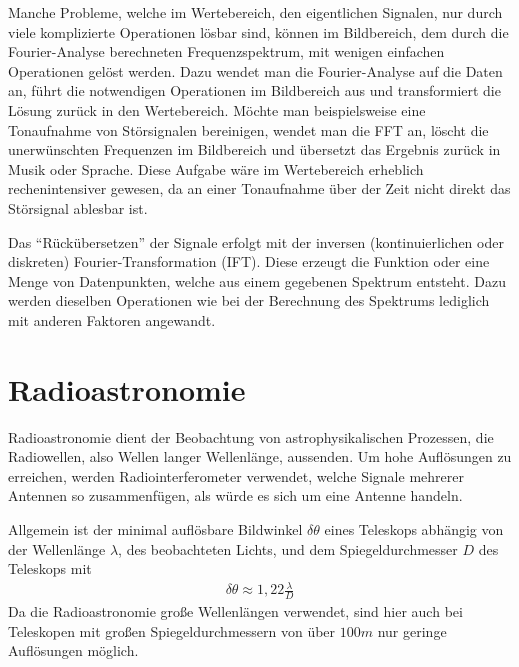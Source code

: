 \documentclass[]{dsadokumentation}
\begin{document}
Manche Probleme, welche im Wertebereich, den eigentlichen Signalen, nur durch viele komplizierte Operationen l\"osbar sind, k\"onnen im Bildbereich, dem durch die Fourier-Analyse berechneten Frequenzspektrum, mit wenigen einfachen Operationen gel\"ost werden. Dazu wendet man die Fourier-Analyse auf die Daten an, führt die notwendigen Operationen im Bildbereich aus und transformiert die Lösung zurück in den Wertebereich. Möchte man beispielsweise eine Tonaufnahme von Störsignalen bereinigen, wendet man die FFT an, löscht die unerwünschten Frequenzen im Bildbereich und übersetzt das Ergebnis zurück in Musik oder Sprache. Diese Aufgabe w\"are im Wertebereich erheblich rechenintensiver gewesen, da an einer Tonaufnahme über der Zeit nicht direkt das Störsignal ablesbar ist.

Das \enquote{Rückübersetzen} der Signale erfolgt mit der inversen (kontinuierlichen oder diskreten) Fourier-Transformation (IFT). Diese erzeugt die Funktion oder eine Menge von Datenpunkten, welche aus einem gegebenen Spektrum entsteht. Dazu werden dieselben Operationen wie bei der Berechnung des Spektrums lediglich mit anderen Faktoren angewandt.




\section{Radioastronomie}

Radioastronomie dient der Beobachtung von astrophysikalischen Prozessen, die Radiowellen, also Wellen langer Wellenlänge, aussenden. Um hohe Auflösungen zu erreichen, werden Radiointerferometer verwendet, welche Signale mehrerer Antennen so zusammenfügen, als würde es sich um eine Antenne handeln.

Allgemein ist der minimal auflösbare Bildwinkel $\delta\theta$ eines Teleskops abhängig von der Wellenlänge $\lambda$, des beobachteten Lichts, und dem Spiegeldurchmesser $D$ des Teleskops mit \begin{eqnarray}
\delta\theta\approx1,22\frac{\lambda}{D}
\end{eqnarray}
Da die Radioastronomie große Wellenlängen verwendet, sind hier auch bei Teleskopen mit großen Spiegeldurchmessern von über $100m$ nur geringe Auflösungen möglich.
\end{document}
